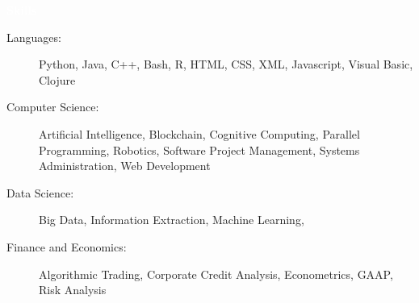 \documentclass[letterpaper,11pt]{article}
\newcommand{\resheading}[1]{{\large \colorbox{mypurple}{\begin{minipage}{\textwidth}{\textbf{#1 \vphantom{p\^{E}}}}\end{minipage}}}}
\begin{document}
	\resheading{\textcolor{white}{Skills}}
	
	\begin{description}
		\item[Languages:] Python, Java, C++, Bash, R, HTML, CSS, XML, Javascript, Visual Basic, Clojure
		\item[Computer Science:] Artificial Intelligence, Blockchain, Cognitive Computing, Parallel Programming, Robotics, Software Project Management, Systems Administration, Web Development
		\item[Data Science:] Big Data, Information Extraction, Machine Learning, 
		\item[Finance and Economics:] Algorithmic Trading, Corporate Credit Analysis, Econometrics, GAAP, Risk Analysis
	\end{description}
	
\end{document}
